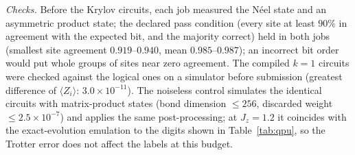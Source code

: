 \documentclass[aps,prx,onecolumn,10pt,nofootinbib,longbibliography,floatfix]{revtex4-2}
\theoremstyle{remark}
\newcommand{\Jz}{J_z}
\newcommand{\ms}{m_s}
\begin{document}
\emph{Checks.} Before the Krylov circuits, each job measured the N\'eel state and an asymmetric product state; the
declared pass condition (every site at least $90\%$ in agreement with the expected bit, and the majority correct) %
held in both jobs (smallest site agreement $0.919$--$0.940$, mean $0.985$--$0.987$); an incorrect bit order would put whole %
groups of sites near zero agreement. The compiled $k=1$ circuits were checked against the logical ones on a simulator %
before submission (greatest difference of $\langle Z_i\rangle$: $3.0\times10^{-11}$). The noiseless control simulates the %
identical circuits with matrix-product states (bond dimension $\le256$, discarded weight $\le2.5\times10^{-7}$) and %
applies the same post-processing; at $\Jz=1.2$ it coincides with the exact-evolution emulation to the digits shown in %
Table~\ref{tab:qpu}, so the Trotter error does not affect the labels at this budget.

\def\SMcap{Our device data at $n=57$, with the noiseless control of the identical circuits and the emulation of %
Sec.~\ref{sm:emu} for comparison. $D$: subspace dimension; $r=(E-E_0)/(E_1-E_0)$; $\Delta\ms$: signed bias against the %
DMRG reference; smallest site excess: $\min_i\eta_i(\langle Z_i\rangle-\langle Z_i\rangle_{\rm DMRG})$, positive in every
row; $\Delta Z$, $\Delta C_{zz}$: mean relative errors of the site labels and of the nearest-neighbour correlations.
In every row all 57 sites are more ordered than the reference.}\def\SMlab{tab:qpu} %

\end{document}
